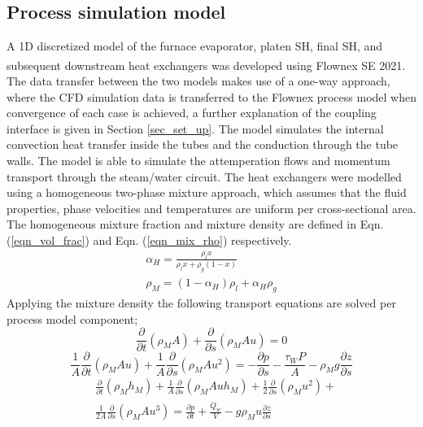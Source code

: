 \documentclass[11pt,cleanfoot]{asme2ej}
\begin{document}
\subsection{Process simulation model}
A 1D discretized model of the furnace evaporator, platen SH, final SH, and subsequent downstream heat exchangers was developed using Flownex SE\textsuperscript{\textregistered} 2021. The data transfer between the two models makes use of a one-way approach, where the CFD simulation data is transferred to the Flownex process model when convergence of each case is achieved, a further explanation of the coupling interface is given in Section  \ref{sec_set_up}. The model simulates the internal convection heat transfer inside the tubes and the conduction through the tube walls. The model is able to simulate the attemperation flows and momentum transport through the steam/water circuit. The heat exchangers were modelled using a homogeneous two-phase mixture approach, which assumes that the fluid properties, phase velocities and temperatures are uniform per cross-sectional area. The homogeneous mixture fraction and mixture density are defined in Eqn. (\ref{eqn_vol_frac}) and Eqn. (\ref{eqn_mix_rho}) respectively.
\begin{gather}
\alpha_H = \frac{\rho_l x}{\rho_lx + \rho_g(1-x)} \label{eqn_vol_frac}\\  
\rho_M = (1-\alpha_H)\rho_l + \alpha_H\rho_g \label{eqn_mix_rho}
\end{gather}
Applying the mixture density the following transport equations are solved per process model component;
\begin{equation}\label{eqn_mix_conti}
\frac{\partial}{\partial t}(\rho_M A)+\frac{\partial}{\partial s}(\rho_MAu) = 0
\end{equation}
\begin{equation}\label{eqn_mix_mom}
\frac{1}{A} \frac{\partial}{\partial t}(\rho_M A u)+\frac{1}{A} \frac{\partial}{\partial s}(\rho_M A u^2) = -\frac{\partial p}{\partial s}-\frac{\tau_W P}{A}- \rho_M g \frac{\partial z}{\partial s}
\end{equation}
\begin{equation}\label{eqn_mix_energy}
\begin{split}
&\frac{\partial}{\partial t}(\rho_Mh_M)+\frac{1}{A}\frac{\partial}{\partial s}(\rho_MAuh_M)+\frac{1}{2}\frac{\partial}{\partial s}(\rho_Mu^2)+\\
&\frac{1}{2A}\frac{\partial}{\partial s}(\rho_MAu^3)=\frac{\partial p}{\partial t} + \frac{\dot{Q}_w}{V}-g\rho_Mu\frac{\partial z}{\partial s}
\end{split}
\end{equation}
\end{document}
